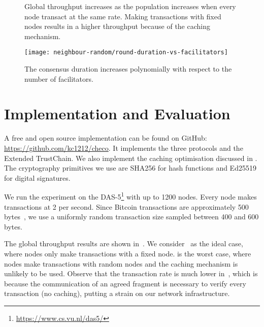 \begin{figure*}[ht]
  \centering
  \caption{Global throughput increases as the population increases when every node transact at the same rate.
  Making transactions with fixed nodes results in a higher throughput because of the caching mechanism.}
  \label{fig:global-throughput}
\end{figure*}

\begin{figure}[ht]
    \centering
    \texttt{[image: neighbour-random/round-duration-vs-facilitators]}
    \caption{The consensus duration increases polynomially with respect to the number of facilitators.}
    \label{fig:round-duration-vs-facilitators}
\end{figure}

\section{Implementation and Evaluation}
\label{sec:implementation}

A free and open source implementation can be found on GitHub: \url{https://github.com/kc1212/checo}.
It implements the three protocols and the Extended TrustChain.
We also implement the caching optimisation discussed in .
The cryptography primitives we use are SHA256 for hash functions and Ed25519 for digital signatures.

We run the experiment on the DAS-5\footnote{\url{https://www.cs.vu.nl/das5/}} with up to 1200 nodes.
Every node makes transactions at 2 per second.
Since Bitcoin transactions are approximately 500 bytes~\cite{txsize},
we use a uniformly random transaction size sampled between 400 and 600 bytes.

The global throughput results are shown in~.
We consider~ as the ideal case,
where nodes only make transactions with a fixed node.
 is the worst case,
where nodes make transactions with random nodes and the caching mechanism is unlikely to be used.
Observe that the transaction rate is much lower in~,
which is because the communication of an agreed fragment is necessary to verify every transaction (no caching),
putting a strain on our network infrastructure.

